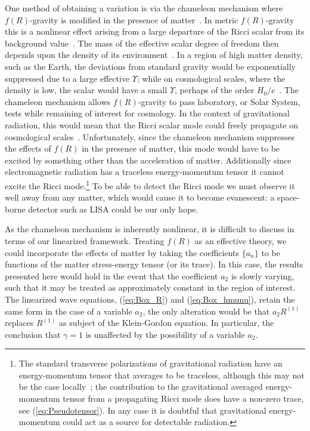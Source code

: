 \documentclass[aps,prd,amsfonts,amssymb,amsmath,nofootinbib,reprint,showpacs]{revtex4-1}
\newcommand{\eqnref}[1]{(\ref{eq:#1})}
\begin{document}
One method of obtaining a variation is via the chameleon mechanism where $f(R)$-gravity is modified in the presence of matter~\cite{Khoury2004, Khoury2004a, Brax2004}. In metric $f(R)$-gravity this is a nonlinear effect arising from a large departure of the Ricci scalar from its background value~\cite{DeFelice2010}. The mass of the effective scalar degree of freedom then depends upon the density of its environment~\cite{Faulkner2007, Li2007}. In a region of high matter density, such as the Earth, the deviations from standard gravity would be exponentially suppressed due to a large effective $\Upsilon$; while on cosmological scales, where the density is low, the scalar would have a small $\Upsilon$, perhaps of the order $H_0/c$~\cite{Khoury2004, Khoury2004a}. The chameleon mechanism allows $f(R)$-gravity to pass laboratory, or Solar System, tests while remaining of interest for cosmology. In the context of gravitational radiation, this would mean that the Ricci scalar mode could freely propagate on cosmological scales~\cite{Corda2009}. Unfortunately, since the chameleon mechanism suppresses the effects of $f(R)$ in the presence of matter, this mode would have to be excited by something other than the acceleration of matter. Additionally since electromagnetic radiation has a traceless energy-momentum tensor it cannot excite the Ricci mode.\footnote{The standard transverse polarizations of gravitational radiation have an energy-momentum tensor that averages to be traceless, although this may not be the case locally~\cite{Butcher2010}; the contribution to the gravitational averaged energy-momentum tensor from a propagating Ricci mode does have a non-zero trace, see \eqnref{Pseudotensor}. In any case it is doubtful that gravitational energy-momentum could act as a source for detectable radiation.} To be able to detect the Ricci mode we must observe it well away from any matter, which would cause it to become evanescent: a space-borne detector such as LISA could be our only hope.

As the chameleon mechanism is inherently nonlinear, it is difficult to discuss in terms of our linearized framework. Treating $f(R)$ as an effective theory, we could incorporate the effects of matter by taking the coefficients $\{a_n\}$ to be functions of the matter stress-energy tensor (or its trace). In this case, the results presented here would hold in the event that the coefficient $a_2$ is slowly varying, such that it may be treated as approximately constant in the region of interest. The linearized wave equations, \eqnref{Box_R} and \eqnref{Box_hmunu}, retain the same form in the case of a variable $a_2$, the only alteration would be that $a_2 R^{(1)}$ replaces $R^{(1)}$ as subject of the Klein-Gordon equation. In particular, the conclusion that $\gamma =1$ is unaffected by the possibility of a variable $a_2$.
\end{document}
